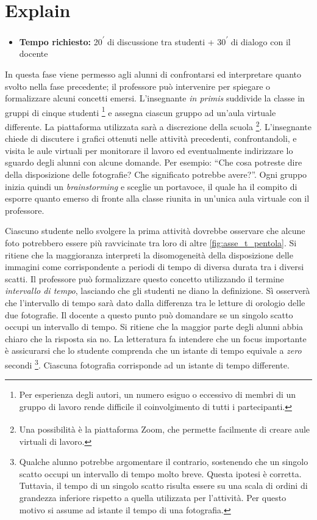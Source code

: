 \documentclass{report} \usepackage[T1]{fontenc} \usepackage[italian]{babel}
\begin{document}
\section{Explain}\label{posizioni_istanti_explain}
\begin{itemize}
\item \textbf{Tempo richiesto:} 20\textsuperscript{$\prime$} di discussione tra
studenti + 30\textsuperscript{$\prime$} di dialogo con il docente
\end{itemize}

In questa fase viene permesso agli alunni di confrontarsi ed interpretare
quanto svolto nella fase precedente; il professore può intervenire per spiegare
o formalizzare alcuni concetti emersi.
L’insegnante \emph{in primis} suddivide la classe in gruppi di cinque studenti
\footnote{
          Per  esperienza degli autori, un numero esiguo o eccessivo di membri
          di un gruppo di lavoro rende difficile il coinvolgimento di tutti i
          partecipanti.
         }
e assegna
ciascun gruppo ad un’aula virtuale differente. La piattaforma utilizzata sarà a
discrezione della scuola
\footnote{
          Una possibilità è la piattaforma Zoom\textsuperscript{\textregistered},
          che  permette facilmente di creare aule virtuali di lavoro.
         }.
L’insegnante chiede di
discutere i grafici ottenuti nelle attività precedenti, confrontandoli, e
visita le aule virtuali per monitorare il lavoro ed eventualmente indirizzare
lo sguardo degli alunni con alcune domande. Per esempio: ``Che cosa potreste
dire della disposizione delle fotografie? Che significato potrebbe avere?''.
Ogni gruppo inizia quindi un \emph{brainstorming} e sceglie un portavoce,
il quale ha il  compito di esporre quanto emerso di fronte alla classe riunita
in un’unica aula virtuale con il professore.

Ciascuno studente nello svolgere la prima attività dovrebbe osservare che
alcune foto potrebbero essere più ravvicinate tra loro di altre
\ref{fig:asse_t_pentola}. Si ritiene che la maggioranza
interpreti la disomogeneità della disposizione delle
immagini come corrispondente a periodi di tempo di diversa durata tra i diversi
scatti. Il professore può formalizzare questo concetto utilizzando il termine
\emph{intervallo di tempo}, lasciando che gli studenti ne diano la definizione.
Sì osserverà che l’intervallo di tempo sarà dato dalla differenza tra le
letture di orologio delle due fotografie. Il docente a questo punto può
domandare se un singolo scatto occupi un intervallo di tempo. Si ritiene che la
maggior parte degli alunni abbia chiaro che la risposta sia no. La letteratura
fa intendere che un focus importante è assicurarsi che lo studente comprenda
che un istante di tempo equivale a \emph{zero} secondi\cite{arons1997teaching}
\footnote{
          Qualche alunno potrebbe argomentare il contrario, sostenendo che un singolo scatto
          occupi un intervallo di tempo molto breve. Questa ipotesi è corretta. Tuttavia,
          il tempo di un singolo scatto risulta essere su una scala di ordini di
          grandezza inferiore rispetto a quella utilizzata per l’attività. Per questo
          motivo si assume ad istante il tempo di una fotografia.
         }.
Ciascuna fotografia corrisponde ad un istante di tempo differente.
\end{document}

